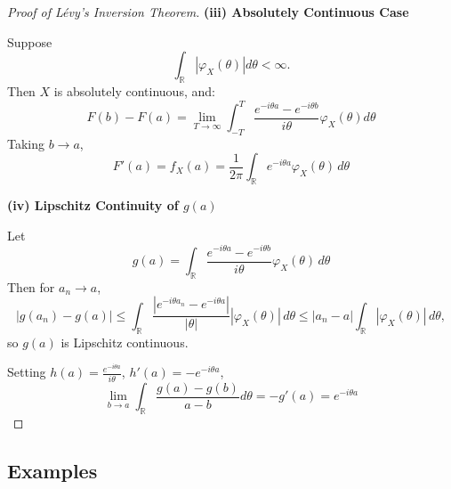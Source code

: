 \documentclass[11pt,a4paper]{article}
\theoremstyle{definition}
\begin{document}
\begin{proof}[Proof of Lévy's Inversion Theorem]
\vspace{1em}

\textbf{(iii) Absolutely Continuous Case}

Suppose
\[
\int_{\mathbb{R}} |\varphi_X(\theta)| d\theta < \infty.
\]
Then \( X \) is absolutely continuous, and:
\[
F(b) - F(a) = \lim_{T\to\infty} \int_{-T}^T \frac{e^{-i\theta a} - e^{-i\theta b}}{i\theta} \varphi_X(\theta) d\theta
\]
Taking $b \to a$,
\[
F'(a) = f_X(a) = \frac{1}{2\pi} \int_{\mathbb{R}} e^{-i\theta a} \varphi_X(\theta)\, d\theta
\]

\vspace{1em}

\textbf{(iv) Lipschitz Continuity of $g(a)$}

Let
\[
g(a) = \int_{\mathbb{R}} \frac{e^{-i\theta a} - e^{-i\theta b}}{i\theta} \varphi_X(\theta)\, d\theta
\]
Then for $a_n \to a$,
\[
|g(a_n) - g(a)| \leq \int_{\mathbb{R}} \frac{|e^{-i\theta a_n} - e^{-i\theta a}|}{|\theta|} |\varphi_X(\theta)|\, d\theta
\leq |a_n - a| \int_{\mathbb{R}} |\varphi_X(\theta)|\, d\theta,
\]
so $g(a)$ is Lipschitz continuous.

Setting $h(a) = \frac{e^{-i\theta a}}{i\theta}$, $h'(a) = -e^{-i\theta a}$,
\[
\lim_{b\to a} \int_{\mathbb{R}} \frac{g(a) - g(b)}{a - b} d\theta = -g'(a) = e^{-i\theta a}
\]
\end{proof}


\subsection{Examples}
\end{document}
